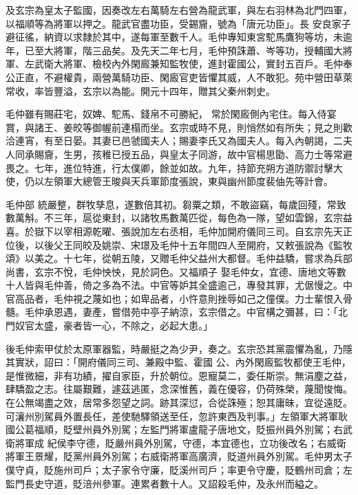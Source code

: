 \begin{pinyinscope}
 及玄宗為皇太子監國，因奏改左右萬騎左右營為龍武軍，與左右羽林為北門四軍，以福順等為將軍以押之。龍武官盡功臣，受錫齎，號為「唐元功臣」。長
 安良家子避征徭，納資以求隸於其中，遂每軍至數千人。毛仲專知東宮駝馬鷹狗等坊，未逾年，已至大將軍，階三品矣。及先天二年七月，毛仲預誅蕭、岑等功，授輔國大將軍、左武衛大將軍、檢校內外閑廄兼知監牧使，進封霍國公，實封五百戶。毛仲奉公正直，不避權貴，兩營萬騎功臣、閑廄官吏皆懼其威，人不敢犯。苑中營田草萊常收，率皆豐溢，玄宗以為能。開元十四年，贈其父秦州刺史。



 毛仲雖有賜莊宅，奴婢、駝馬、錢帛不可勝紀，
 常於閑廄側內宅住。每入侍宴賞，與諸王、姜皎等御幄前連榻而坐。玄宗或時不見，則悄然如有所失；見之則歡洽連宵，有至日晏。其妻已邑虢國夫人；賜妻李氏又為國夫人。每入內朝謁，二夫人同承賜齎，生男，孩稚已授五品，與皇太子同游，故中官楊思勖、高力士等常避畏之。七年，進位特進，行太僕卿，餘並如故。九年，持節充朔方道防禦討擊大使，仍以左領軍大總管王晙與天兵軍節度張說，東與幽州節度裴伷先等計會。



 毛仲部
 統嚴整，群牧孳息，遂數倍其初。芻粟之類，不敢盜竊，每歲回殘，常致數萬斛。不三年，扈從東封，以諸牧馬數萬匹從，每色為一隊，望如雲錦，玄宗益喜。於嶽下以宰相源乾曜、張說加左右丞相，毛仲加開府儀同三司。自玄宗先天正位後，以後父王同皎及姚崇、宋璟及毛仲十五年間四人至開府，又敕張說為《監牧頌》以美之。十七年，從朝五陵，又贈毛仲父益州大都督。毛仲益驕，嘗求為兵部尚書，玄宗不悅，毛仲怏怏，見於詞色。又福順子
 娶毛仲女，宜德、唐地文等數十人皆與毛仲善，倚之多為不法。中官等妒其全盛逾己，專發其罪，尤倨慢之。中官高品者，毛仲視之蔑如也；如卑品者，小忤意則挫辱如己之僮僕。力士輩恨入骨髓。毛仲承恩遇，妻產，嘗借苑中亭子納涼，玄宗借之。中官構之彌甚，曰：「北門奴官太盛，豪者皆一心，不除之，必起大患。」



 後毛仲索甲仗於太原軍器監，時嚴挺之為少尹，奏之。玄宗恐其黨震懼為亂，乃隱其實狀，詔曰：「開府儀同三司、兼殿中監、霍國
 公、內外閑廄監牧都使王毛仲，是惟微細，非有功績，擢自家臣，升於朝位。恩寵莫二，委任斯崇。無涓塵之益，肆驕盈之志。往屬艱難，遽茲逃匿，念深惟舊，義在優容，仍荷殊榮，蔑聞悛悔。在公無竭盡之效，居常多怨望之詞。跡其深愆，合從誅殛；恕其庸昧，宜從遠貶。可瀼州別駕員外置長任，差使馳驛領送至任，忽許東西及判事。」左領軍大將軍耿國公葛福順，貶壁州員外別駕；左監門將軍盧龍子唐地文，貶振州員外別駕；右武衛將軍成
 紀侯李守德，貶嚴州員外別駕，守德，本宜德也，立功後改名；右威衛將軍王景耀，貶黨州員外別駕；右威衛將軍高廣濟，貶道州員外別駕。毛仲男太子僕守貞，貶施州司戶；太子家令守廉，貶溪州司戶；率更令守慶，貶鶴州司倉；左監門長史守道，貶涪州參軍。連累者數十人。又詔殺毛仲，及永州而縊之。




\end{pinyinscope}
